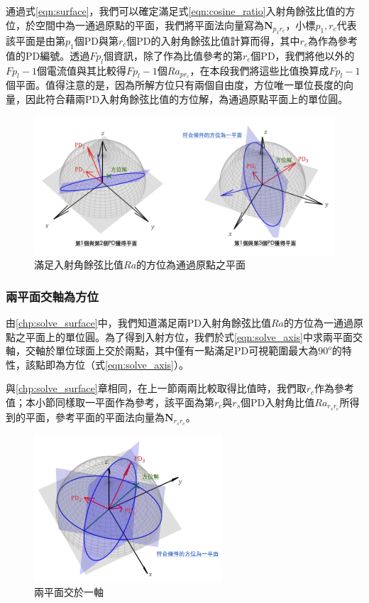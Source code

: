         通過式\ref{eqn:surface}，我們可以確定滿足式\ref{eqn:cosine_ratio}入射角餘弦比值的方位，於空間中為一通過原點的平面，我們將平面法向量寫為$\boldsymbol{N}_{p_1r_c}$，小標$p_1,r_c$代表該平面是由第$p_1$個PD與第$r_c$個PD的入射角餘弦比值計算而得，其中$r_c$為作為參考值的PD編號。透過$Fp_l$個資訊，除了作為比值參考的第$r_c$個PD，我們將他以外的$Fp_l-1$個電流值與其比較得$Fp_l-1$個$Ra_{pr_c}$，在本段我們將這些比值換算成$Fp_l-1$個平面。值得注意的是，因為所解方位只有兩個自由度，方位唯一單位長度的向量，因此符合藉兩PD入射角餘弦比值的方位解，為通過原點平面上的單位圓。



        \begin{figure}[h]
            \centering
            \includegraphics[width=14cm]{ch3pic/solve_surface.png}
            \caption{滿足入射角餘弦比值$Ra$的方位為通過原點之平面}
            \label{pic:solve_surface}
        \end{figure}

    \subsubsection{兩平面交軸為方位}
    \label{chp:solve_axis}

        由\ref{chp:solve_surface}中，我們知道滿足兩PD入射角餘弦比值$Ra$的方位為一通過原點之平面上的單位圓。為了得到入射方位，我們於式\ref{eqn:solve_axis}中求兩平面交軸，交軸於單位球面上交於兩點，其中僅有一點滿足PD可視範圍最大為$90^o$的特性，該點即為方位（式\ref{eqn:solve_axis}）。

        與\ref{chp:solve_surface}章相同，在上一節兩兩比較取得比值時，我們取$r_c$作為參考值；本小節同樣取一平面作為參考，該平面為第$r_c$與$r_s$個PD入射角比值$Ra_{r_sr_c}$所得到的平面，參考平面的平面法向量為$\boldsymbol{N}_{r_sr_c}$。

        \begin{figure}[h]
            \centering
            \includegraphics[width=7cm]{ch3pic/solve_axis.png}
            \caption{兩平面交於一軸}
            \label{pic:solve_axis}
        \end{figure}

